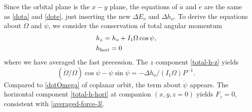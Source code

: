 \documentclass[twocolumn,linenumbers]{aastex631}
\begin{document}
Since the orbital plane is the $x-y$ plane, the equations of $\dot a$ and $\dot e$ are the same as \eqref{dota} and \eqref{dote}, just inserting the new $\Delta E_o$ and $\Delta h_o$. To derive the equations about $\dot\Omega$ and $\dot\psi$, we consider the conservation of total angular momentum
\begin{align}
& h_z=h_o+I_1\Omega\cos\psi, \label{total-h-z} \\
& h_{\rm hori}=0 \label{total-h-hori}
\end{align}
where we have averaged the fast precession. The $z$ component \eqref{total-h-z} yields
\begin{equation}\label{dotOmega3d}
(\dot\Omega/\Omega)\cos\psi-\dot\psi\sin\psi=-\Delta h_o/(I_1\Omega)P^{-1}.
\end{equation}
Compared to \eqref{dotOmega} of coplanar orbit, the term about $\dot\psi$ appears. The horizontal component \eqref{total-h-hori} at companion $(x,y,z=0)$ yields $F_z=0$, consistent with \eqref{averaged-force-3}.
\end{document}
